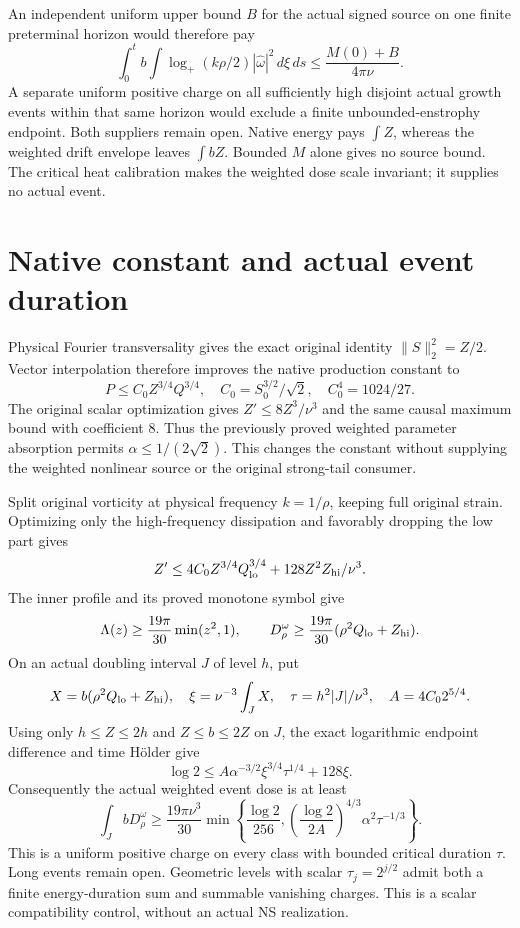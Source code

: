 \documentclass[11pt]{article}
\begin{document}
An independent uniform upper bound $B$ for the actual signed source
on one finite preterminal horizon would therefore pay
\[
 \int_0^t b\int\log_+(k\rho/2)|\widehat\omega|^2\,d\xi\,ds
 \le\frac{M(0)+B}{4\pi\nu}.
\]
A separate uniform positive charge on all sufficiently high disjoint
actual growth events within that same horizon would exclude a finite
unbounded-enstrophy endpoint. Both suppliers remain open. Native energy
pays $\int Z$, whereas the weighted drift envelope leaves $\int bZ$.
Bounded $M$ alone gives no source bound. The critical heat calibration
makes the weighted dose scale invariant; it supplies no actual event.

\section{Native constant and actual event duration}
Physical Fourier transversality gives the exact original identity
$\|S\|_2^2=Z/2$. Vector interpolation therefore improves the native
production constant to
\[
 P\le C_0Z^{3/4}Q^{3/4},\quad
 C_0=S_0^{3/2}/\sqrt2,\quad C_0^4=1024/27.
\]
The original scalar optimization gives $Z'\le8Z^3/\nu^3$ and the
same causal maximum bound with coefficient 8. Thus the previously
proved weighted parameter absorption permits
$\alpha\le1/(2\sqrt2)$. This changes the constant without supplying
the weighted nonlinear source or the original strong-tail consumer.

Split original vorticity at physical frequency $k=1/\rho$, keeping
full original strain. Optimizing only the high-frequency dissipation
and favorably dropping the low part gives
\[
 Z'\le4C_0Z^{3/4}Q_{\rm lo}^{3/4}
       +128Z^2Z_{\rm hi}/\nu^3.
\]
The inner profile and its proved monotone symbol give
\[
 \Lambda(z)\ge\frac{19\pi}{30}\min(z^2,1),\qquad
 D^\omega_\rho\ge\frac{19\pi}{30}
                  (\rho^2Q_{\rm lo}+Z_{\rm hi}).
\]
On an actual doubling interval $J$ of level $h$, put
\[
 X=b(\rho^2Q_{\rm lo}+Z_{\rm hi}),\quad
 \xi=\nu^{-3}\int_JX,\quad \tau=h^2|J|/\nu^3,\quad
 A=4C_0 2^{5/4}.
\]
Using only $h\le Z\le2h$ and $Z\le b\le2Z$ on $J$, the exact
logarithmic endpoint difference and time H\"older give
\[
 \log2\le A\alpha^{-3/2}\xi^{3/4}\tau^{1/4}+128\xi.
\]
Consequently the actual weighted event dose is at least
\[
 \int_J bD^\omega_\rho\ge\frac{19\pi\nu^3}{30}
 \min\left\{\frac{\log2}{256},
       \left(\frac{\log2}{2A}\right)^{4/3}
                    \alpha^2\tau^{-1/3}\right\}.
\]
This is a uniform positive charge on every class with bounded critical
duration $\tau$. Long events remain open. Geometric levels with scalar
$\tau_j=2^{j/2}$ admit both a finite energy-duration sum and summable
vanishing charges. This is a scalar compatibility control, without an
actual NS realization.
\end{document}
